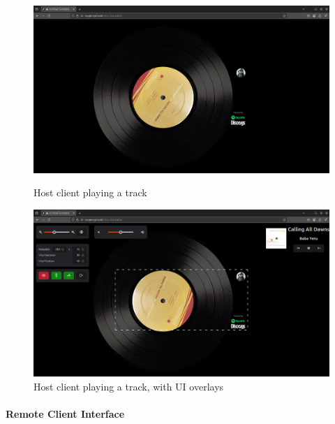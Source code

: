             \begin{figure}[h]
                \centering
                \begin{minipage}[b]{0.45\textwidth}
                    \centering
                    \includegraphics[width=\textwidth]{images/screenshots/HOST_Quiet.png}
                    \caption{Host client playing a track}
                    \label{fig:hostQuiet}
                \end{minipage}
                \hfill
                \begin{minipage}[b]{0.45\textwidth}
                    \centering
                    \includegraphics[width=\textwidth]{images/screenshots/HOST_GUI.png}
                    \caption{Host client playing a track, with UI overlays}
                    \label{fig:hostGui}
                \end{minipage}
            \end{figure}
    
            \paragraph{Remote Client Interface}
    
